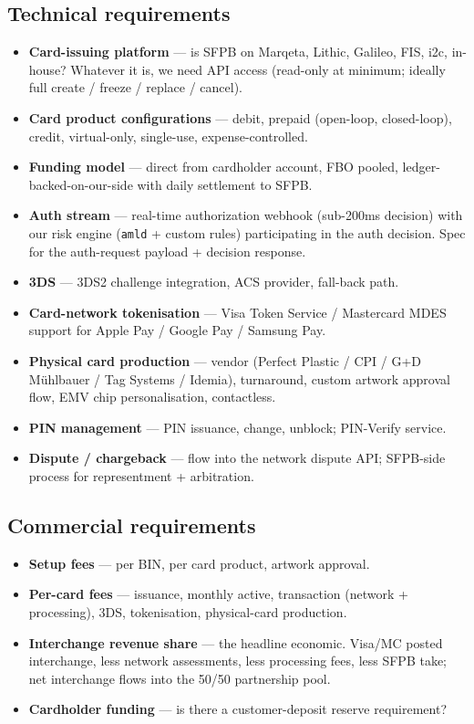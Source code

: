 \documentclass[11pt,letterpaper]{article}
\begin{document}
\subsection{Technical requirements}
\begin{itemize}[leftmargin=1.6em]
  \item \textbf{Card-issuing platform} --- is SFPB on Marqeta, Lithic,
        Galileo, FIS, i2c, in-house? Whatever it is, we need API
        access (read-only at minimum; ideally full create / freeze /
        replace / cancel).
  \item \textbf{Card product configurations} --- debit, prepaid
        (open-loop, closed-loop), credit, virtual-only, single-use,
        expense-controlled.
  \item \textbf{Funding model} --- direct from cardholder account,
        FBO pooled, ledger-backed-on-our-side with daily settlement
        to SFPB.
  \item \textbf{Auth stream} --- real-time authorization webhook
        (sub-200ms decision) with our risk engine (\texttt{amld} +
        custom rules) participating in the auth decision. Spec for
        the auth-request payload + decision response.
  \item \textbf{3DS} --- 3DS2 challenge integration, ACS provider,
        fall-back path.
  \item \textbf{Card-network tokenisation} --- Visa Token Service /
        Mastercard MDES support for Apple Pay / Google Pay /
        Samsung Pay.
  \item \textbf{Physical card production} --- vendor (Perfect Plastic /
        CPI / G+D M\"uhlbauer / Tag Systems / Idemia), turnaround,
        custom artwork approval flow, EMV chip personalisation,
        contactless.
  \item \textbf{PIN management} --- PIN issuance, change, unblock;
        PIN-Verify service.
  \item \textbf{Dispute / chargeback} --- flow into the network
        dispute API; SFPB-side process for representment +
        arbitration.
\end{itemize}

\subsection{Commercial requirements}
\begin{itemize}[leftmargin=1.6em]
  \item \textbf{Setup fees} --- per BIN, per card product, artwork
        approval.
  \item \textbf{Per-card fees} --- issuance, monthly active,
        transaction (network + processing), 3DS, tokenisation,
        physical-card production.
  \item \textbf{Interchange revenue share} --- the headline economic.
        Visa/MC posted interchange, less network assessments, less
        processing fees, less SFPB take; net interchange flows into
        the 50/50 partnership pool.
  \item \textbf{Cardholder funding} --- is there a customer-deposit
        reserve requirement?
\end{itemize}
\end{document}
